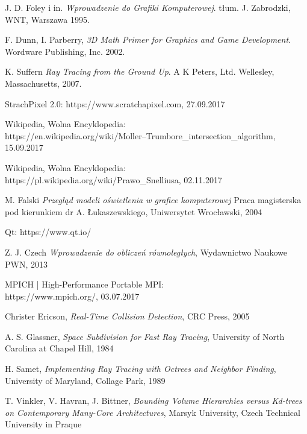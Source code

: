 \documentclass[eng,pl,printmode,openany]{mgr}
\begin{document}
%
\begin{thebibliography}{9}

  J. D. Foley i in.
  \emph{Wprowadzenie do Grafiki Komputerowej}.
  tłum. J. Zabrodzki,
  WNT, Warszawa
  1995.
  
  F. Dunn, I. Parberry,
  \emph{3D Math Primer for Graphics and Game Development}.
  Wordware Publishing, Inc.
  2002.
  
	K. Suffern
	\emph{Ray Tracing from the Ground Up}.
	A K Peters, Ltd.
	Wellesley, Massachusetts,
	2007.
	
	StrachPixel 2.0:
	https://www.scratchapixel.com, 27.09.2017
	
	Wikipedia, Wolna Encyklopedia:\\ 
	https://en.wikipedia.org/wiki/Moller–Trumbore\_intersection\_algorithm, 15.09.2017
	
	
	Wikipedia, Wolna Encyklopedia:\\ 
	https://pl.wikipedia.org/wiki/Prawo\_Snelliusa,
	02.11.2017
	
	
	M. Falski
	\emph{Przegląd modeli oświetlenia w grafice komputerowej}
	Praca magisterska pod kierunkiem dr A. Łukaszewskiego,
	Uniwersytet Wrocławski,
	2004
	
	Qt: https://www.qt.io/
	
	Z. J. Czech
	\emph{Wprowadzenie do obliczeń równoległych},
	Wydawnictwo Naukowe PWN, 2013
	
	MPICH | High-Performance Portable MPI: \\
	https://www.mpich.org/, 03.07.2017


	Christer Ericson,
	\emph{Real-Time Collision Detection},
	CRC Press, 2005
	

	A. S. Glassner,
	\emph{Space Subdivision for Fast Ray Tracing},
	University of North Carolina at Chapel Hill,
	1984

	H. Samet,
	\emph{Implementing Ray Tracing with Octrees and Neighbor Finding},
	University of Maryland,
	Collage Park, 1989
	
	T. Vinkler, V. Havran, J. Bittner,
	\emph{Bounding Volume Hierarchies versus Kd-trees on Contemporary Many-Core Architectures},
	Marsyk University, Czech Technical University in Praque


\end{thebibliography}
\end{document}
